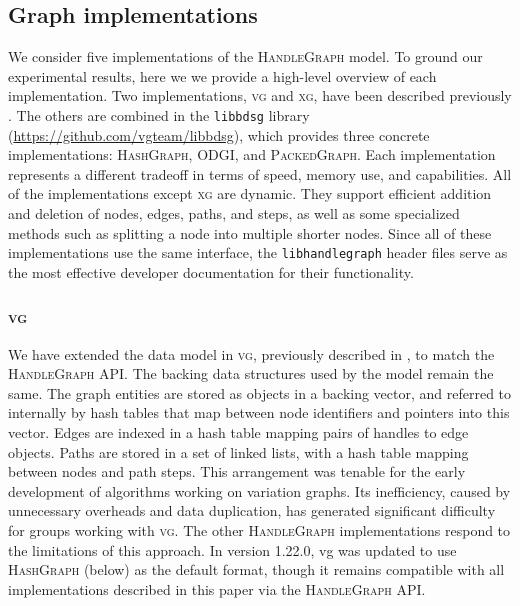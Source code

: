 \documentclass{bioinfo}
\begin{document}
\begin{methods}
\subsection{Graph implementations}

We consider five implementations of the \textsc{HandleGraph} model.
To ground our experimental results, here we we provide a high-level overview of each implementation.
Two implementations, \textsc{vg} and \textsc{xg}, have been described previously \citep{Garrison_2018,Garrison_2019}.
The others are combined in the \texttt{libbdsg} library (\url{https://github.com/vgteam/libbdsg}), which provides three concrete implementations: \textsc{HashGraph}, \textsc{ODGI}, and \textsc{PackedGraph}.
Each implementation represents a different tradeoff in terms of speed, memory use, and capabilities.
All of the implementations except \textsc{xg} are dynamic.
They support efficient addition and deletion of nodes, edges, paths, and steps, as well as some specialized methods such as splitting a node into multiple shorter nodes.
Since all of these implementations use the same interface, the \texttt{libhandlegraph} header files serve as the most effective developer documentation for their functionality.

\subsubsection{\textsc{vg}}

We have extended the data model in \textsc{vg}, previously described in \citep{Garrison_2018}, to match the \textsc{HandleGraph} API.
The backing data structures used by the model remain the same.
The graph entities are stored as objects in a backing vector, and referred to internally by hash tables that map between node identifiers and pointers into this vector.
Edges are indexed in a hash table mapping pairs of handles to edge objects.
Paths are stored in a set of linked lists, with a hash table mapping between nodes and path steps.
This arrangement was tenable for the early development of algorithms working on variation graphs.
Its inefficiency, caused by unnecessary overheads and data duplication, has generated significant difficulty for groups working with \textsc{vg}.
The other \textsc{HandleGraph} implementations respond to the limitations of this approach.
In version 1.22.0, vg was updated to use \textsc{HashGraph} (below) as the default format, though it remains compatible with all implementations described in this paper via the \textsc{HandleGraph} API.


\end{methods}
\end{document}
